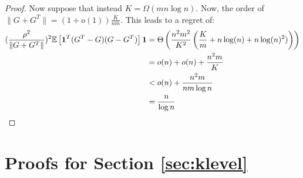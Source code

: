 \begin{proof}
    Now suppose that instead $K = \Omega ( mn \log n) $. Now, the order of $\|G+G^T\| = (1 + o(1)) \frac{K}{nm}$. This leads to a regret of: 
    \begin{align*}
        (\frac{\rho^2}{\|G+G^T\|} )^2 \mathbb{E}\left[  \mathbf{1}^T (G^T-G)(G-G^T) \right] \mathbf{1} &= \Theta \left( \frac{n^2 m^2}{K^2 } \left( \frac{K}{m} + n \log(n) + n \log(n)^2 ) \right) \right)\\
        &= o(n) + o(n) + \frac{n^2 m}{K} \\
        &< o(n) + \frac{n^2 m}{nm \log n} \\
        &= \frac{n}{\log n}
    \end{align*}
\end{proof}

\section{Proofs for Section \ref{sec:klevel}}

